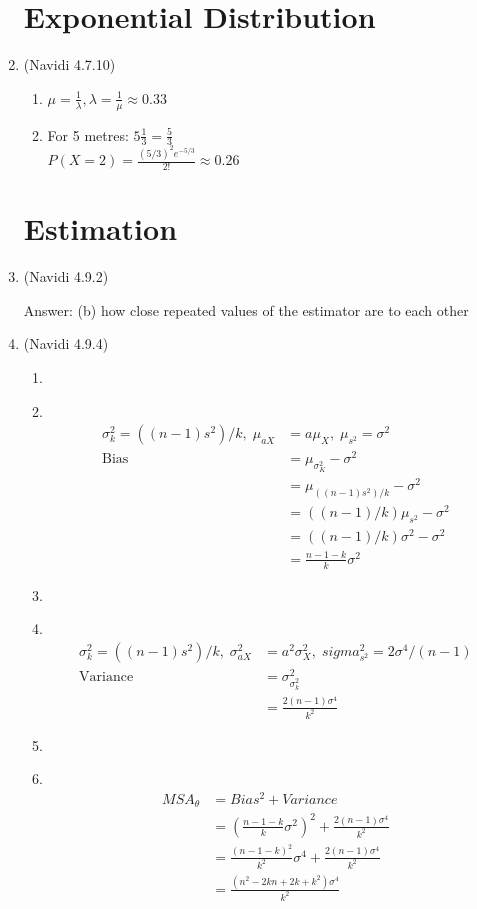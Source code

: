 \documentclass[11pt]{article}
\newcommand\Item[1][]{%
  \ifx\relax#1\relax  \item \else \item[#1] \fi
  \abovedisplayskip=0pt\abovedisplayshortskip=0pt~\vspace*{-\baselineskip}}
\begin{document}
\begin{preview}
\begin{enumerate}
\section*{Exponential Distribution}
\item (Navidi 4.7.10)
\begin{enumerate}
        \item $\mu = \frac{1}{\lambda}, \lambda = \frac{1}{\mu} \approx 0.33$
        \item For 5 metres: $5\frac{1}{3} = \frac{5}{3}$ \\
        $P(X=2) = \frac{(5/3)^{2}e^{-5/3}}{2!} \approx 0.26$
\end{enumerate}

\section*{Estimation}
\item (Navidi 4.9.2) 

Answer: (b)  how close repeated values of the estimator are to each other
\item (Navidi 4.9.4)
\begin{enumerate}
        \Item 
        \begin{align*}
                \sigma_{k}^{2} = ((n-1)s^2)/k, \; \mu_{aX} &= a\mu_X, \; \mu_{s^2} = \sigma^2 \\
                \mathrm{Bias} &= \mu_{\sigma_K^2} - \sigma^2 \\
                &= \mu_{((n-1)s^2)/k} - \sigma^2 \\
                &= ((n-1)/k)\mu_{s^2} - \sigma^2 \\
                &= ((n-1)/k)\sigma^2 - \sigma^2 \\
                &= \frac{n-1-k}{k}\sigma^2
        \end{align*}
        \Item 
        \begin{align*}
                \sigma_{k}^{2} = ((n-1)s^2)/k, \; \sigma^2_{aX} &= a^2\sigma^2_X, \; sigma^2_{s^2} = 2\sigma^4/(n-1) \\
                \mathrm{Variance} &= \sigma^2_{\sigma_{k}^{2}} \\
                &= \frac{2(n-1)\sigma^4}{k^2}
        \end{align*}
        \Item 
        \begin{align*}
                MSA_\theta &= Bias^2 + Variance \\
                &= (\frac{n-1-k}{k}\sigma^2)^2 + \frac{2(n-1)\sigma^4}{k^2} \\
                &= \frac{(n-1-k)^2}{k^2}\sigma^4 + \frac{2(n-1)\sigma^4}{k^2} \\
                &= \frac{(n^2 - 2kn + 2k + k^2)\sigma^4}{k^2}
        \end{align*}
\end{enumerate}

\end{enumerate}
\end{preview}
\end{document}
